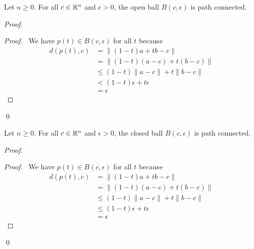 \begin{proposition}
    Let $n \geq 0$. For all $c \in \mathbb{R}^n$ and $\epsilon > 0$, the open ball $B(c,\epsilon)$ is path connected.
\end{proposition}

\begin{proof}
    \pf
    \begin{proof}
        \pf\ We have $p(t) \in B(c,\epsilon)$ for all $t$ because
        \begin{align*}
            d(p(t),c) & = \| (1-t)a + tb - c \| \\
        & = \| (1-t)(a-c) + t(b-c) \| \\
        & \leq (1-t) \| a-c \| + t \| b-c \| \\
        & < (1-t) \epsilon + t \epsilon \\
        & = \epsilon
        \end{align*}
    \end{proof}
    \qed
\end{proof}

\begin{proposition}
    Let $n \geq 0$. For all $c \in \mathbb{R}^n$ and $\epsilon > 0$, the closed ball $\overline{B(c,\epsilon)}$ is path connected.
\end{proposition}

\begin{proof}
    \pf
    \begin{proof}
        \pf\ We have $p(t) \in \overline{B(c,\epsilon)}$ for all $t$ because
        \begin{align*}
            d(p(t),c) & = \| (1-t)a + tb - c \| \\
        & = \| (1-t)(a-c) + t(b-c) \| \\
        & \leq (1-t) \| a-c \| + t \| b-c \| \\
        & \leq (1-t) \epsilon + t \epsilon \\
        & = \epsilon
        \end{align*}
    \end{proof}
    \qed
\end{proof}

